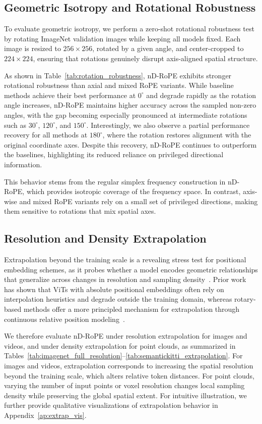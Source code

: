 \documentclass{article}
\theoremstyle{plain}
\theoremstyle{definition}
\theoremstyle{remark}
\begin{document}
\subsection{Geometric Isotropy and Rotational Robustness}
\label{subsec:isotropy}
To evaluate geometric isotropy, we perform a zero-shot rotational robustness test by rotating ImageNet validation images while keeping all models fixed. Each image is resized to $256 \times 256$, rotated by a given angle, and center-cropped to $224 \times 224$, ensuring that rotations genuinely disrupt axis-aligned spatial structure.

As shown in Table~\ref{tab:rotation_robustness}, nD-RoPE exhibits stronger rotational robustness than axial and mixed RoPE variants. While baseline methods achieve their best performance at $0^\circ$ and degrade rapidly as the rotation angle increases, nD-RoPE maintains higher accuracy across the sampled non-zero angles, with the gap becoming especially pronounced at intermediate rotations such as $30^\circ$, $120^\circ$, and $150^\circ$. Interestingly, we also observe a partial performance recovery for all methods at $180^\circ$, where the rotation restores alignment with the original coordinate axes. Despite this recovery, nD-RoPE continues to outperform the baselines, highlighting its reduced reliance on privileged directional information.

This behavior stems from the regular simplex frequency construction in nD-RoPE, which provides isotropic coverage of the frequency space. In contrast, axis-wise and mixed RoPE variants rely on a small set of privileged directions, making them sensitive to rotations that mix spatial axes.

\subsection{Resolution and Density Extrapolation}
Extrapolation beyond the training scale is a revealing stress test for positional embedding schemes, as it probes whether a model encodes geometric relationships that generalize across changes in resolution and sampling density~\cite{ding2024longrope,zhao2024length}. Prior work has shown that ViTs with absolute positional embeddings often rely on interpolation heuristics and degrade outside the training domain, whereas rotary-based methods offer a more principled mechanism for extrapolation through continuous relative position modeling~\cite{su2024roformer,heo2024rotary,peng2023yarn}.

We therefore evaluate nD-RoPE under resolution extrapolation for images and videos, and under density extrapolation for point clouds, as summarized in Tables~\ref{tab:imagenet_full_resolution}–\ref{tab:semantickitti_extrapolation}.
For images and videos, extrapolation corresponds to increasing the spatial resolution beyond the training scale, which alters relative token distances.
For point clouds, varying the number of input points or voxel resolution changes local sampling density while preserving the global spatial extent. For intuitive illustration, we further provide qualitative visualizations of extrapolation behavior in Appendix~\ref{ap:extrap_vis}.
\end{document}
